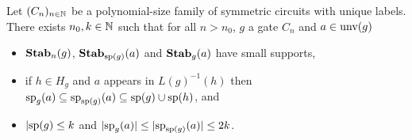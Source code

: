 \documentclass[../paper.tex]{subfiles}
\begin{document}
\begin{lem}
  \label{lem:row-column-supports}
  Let $(C_n)_{n \in \mathbb{N}}$ be a polynomial-size family of symmetric circuits
  with unique labels. There exists $n_0, k \in \mathbb{N}$ such that for all $n >
  n_0$, $g$ a gate $C_n$ and $a \in \text{unv}(g)$
  \begin{itemize}
    
    \setlength\itemsep{0mm}
  \item $\text{\textbf{Stab}}_n(g)$, $\text{\textbf{Stab}}_{\text{sp}(g)}(a)$ and $\text{\textbf{Stab}}_{g}(a)$ have small
    supports,
  \item if $h \in H_g$ and $a$ appears in $L(g)^{-1}(h)$ then $\text{sp}_g(a)
    \subseteq \text{sp}_{\text{sp}(g)}(a) \subseteq \text{sp}(g) \cup \text{sp}(h)$, and
  \item $\vert \text{sp}(g) \leq k$ and $\vert \text{sp}_g(a) \vert \leq \vert
    \text{sp}_{\text{sp}(g)}(a) \vert \leq 2k$.
    
  \end{itemize}
  

  

\end{lem}
\end{document}
